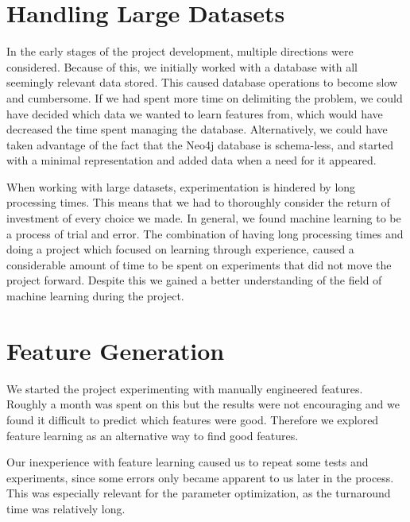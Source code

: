 \section{Handling Large Datasets}
In the early stages of the project development, multiple directions were considered. Because of this, we initially worked with a database with all seemingly relevant data stored. This caused database operations to become slow and cumbersome. If we had spent more time on delimiting the problem, we could have decided which data we wanted to learn features from, which would have decreased the time spent managing the database. Alternatively, we could have taken advantage of the fact that the Neo4j database is schema-less, and started with a minimal representation and added data when a need for it appeared.

When working with large datasets, experimentation is hindered by long processing times. This means that we had to thoroughly consider the return of investment of every choice we made. In general, we found machine learning to be a process of trial and error. The combination of having long processing times and doing a project which focused on learning through experience, caused a considerable amount of time to be spent on experiments that did not move the project forward. Despite this we gained a better understanding of the field of machine learning during the project.

\section{Feature Generation}
We started the project experimenting with manually engineered features. Roughly a month was spent on this but the results were not encouraging and we found it difficult to predict which features were good. Therefore we explored feature learning as an alternative way to find good features.

Our inexperience with feature learning caused us to repeat some tests and experiments, since some errors only became apparent to us later in the process. This was especially relevant for the parameter optimization, as the turnaround time was relatively long.

